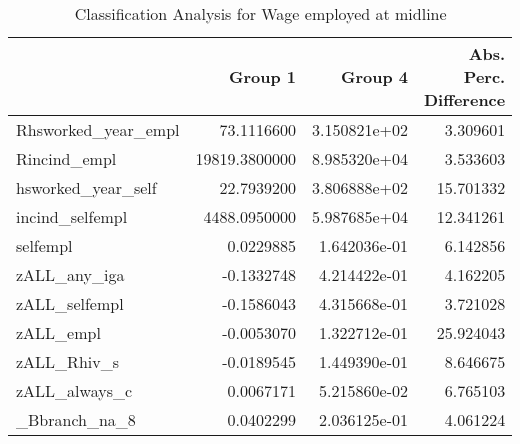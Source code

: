 \begin{table}

\caption{\label{tab:clanRempl}Classification Analysis for Wage employed at midline}
\centering
\begin{tabular}[t]{lrrr}
\toprule
  & Group 1 & Group 4 & Abs. Perc. Difference\\
\midrule
Rhsworked\_year\_empl & 73.1116600 & 3.150821e+02 & 3.309601\\
Rincind\_empl & 19819.3800000 & 8.985320e+04 & 3.533603\\
hsworked\_year\_self & 22.7939200 & 3.806888e+02 & 15.701332\\
incind\_selfempl & 4488.0950000 & 5.987685e+04 & 12.341261\\
selfempl & 0.0229885 & 1.642036e-01 & 6.142856\\
\addlinespace
zALL\_any\_iga & -0.1332748 & 4.214422e-01 & 4.162205\\
zALL\_selfempl & -0.1586043 & 4.315668e-01 & 3.721028\\
zALL\_empl & -0.0053070 & 1.322712e-01 & 25.924043\\
zALL\_Rhiv\_s & -0.0189545 & 1.449390e-01 & 8.646675\\
zALL\_always\_c & 0.0067171 & 5.215860e-02 & 6.765103\\
\addlinespace
\_Bbranch\_na\_8 & 0.0402299 & 2.036125e-01 & 4.061224\\
\bottomrule
\end{tabular}
\end{table}
